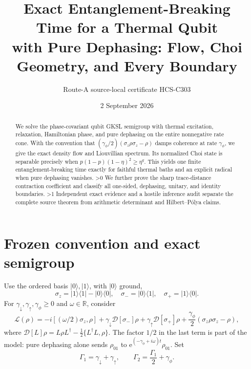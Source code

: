 \documentclass[10pt]{article}
\title{Exact Entanglement-Breaking Time for a Thermal Qubit\\
with Pure Dephasing: Flow, Choi Geometry, and Every Boundary}
\author{Route-A source-local certificate HCS-C303}
\date{2 September 2026}
\providecommand{\CRevisionRound}{2}
\newcommand{\D}{\mathcal D}
\newcommand{\ee}{\mathrm e}
\begin{document}
\maketitle
\begin{abstract}
We solve the phase-covariant qubit GKSL semigroup with thermal excitation,
relaxation, Hamiltonian phase, and pure dephasing on the entire nonnegative
rate cone.  With the convention that $(\gamma_\phi/2)
(\sigma_z\rho\sigma_z-\rho)$ damps coherence at rate $\gamma_\phi$, we give
the exact density flow and Liouvillian spectrum.  Its normalized Choi state
is separable precisely when
$p(1-p)(1-\eta)^2\geq\eta^q$.
This yields one finite entanglement-breaking time exactly for faithful thermal
baths and an explicit radical when pure dephasing vanishes.
\ifnum\CRevisionRound>0
We further prove the sharp trace-distance contraction coefficient and classify
all one-sided, dephasing, unitary, and identity boundaries.
\fi
\ifnum\CRevisionRound>1
Independent exact evidence and a hostile inference audit separate the complete
source theorem from arithmetic determinant and Hilbert--P\'olya claims.
\fi
\end{abstract}

\section{Frozen convention and exact semigroup}
Use the ordered basis $|0\rangle,|1\rangle$, with $|0\rangle$ ground,
\[
 \sigma_z=|1\rangle\langle1|-|0\rangle\langle0|,
 \quad \sigma_-=|0\rangle\langle1|,
 \quad \sigma_+=|1\rangle\langle0|.
\]
For $\gamma_\downarrow,\gamma_\uparrow,\gamma_\phi\geq0$ and
$\omega\in\mathbb R$, consider
\begin{equation}\label{eq:gksl}
 \mathcal L(\rho)=-i[(\omega/2)\sigma_z,\rho]
 +\gamma_\downarrow\D[\sigma_-]\rho
 +\gamma_\uparrow\D[\sigma_+]\rho
 +\frac{\gamma_\phi}{2}(\sigma_z\rho\sigma_z-\rho),
\end{equation}
where $\D[L]\rho=L\rho L^\dagger-\tfrac12\{L^\dagger L,\rho\}$.
The factor $1/2$ in the last term is part of the model: pure dephasing alone
sends $\rho_{01}$ to $\ee^{(-\gamma_\phi+i\omega)t}\rho_{01}$.
Set
\[
 \Gamma_1=\gamma_\downarrow+\gamma_\uparrow,
 \qquad \Gamma_2=\frac{\Gamma_1}{2}+\gamma_\phi.
\]
\end{document}
